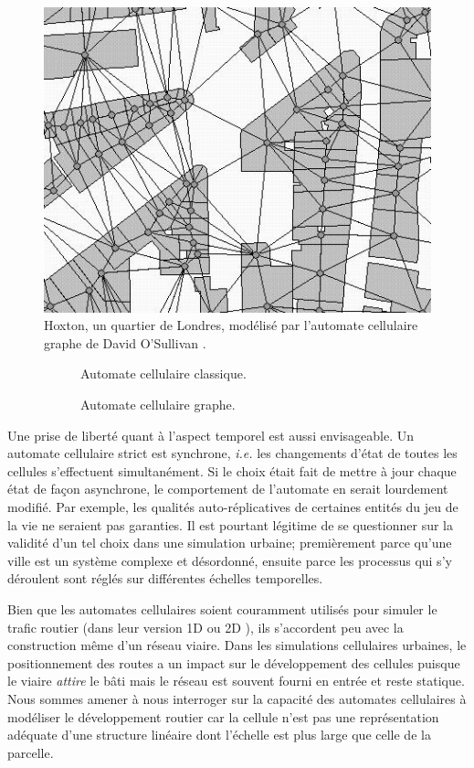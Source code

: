 \documentclass[12pt]{article}
\begin{document}
\begin{figure}[H]
  \centering
  \includegraphics[width=.7\linewidth]{images/gca.png}
  \caption{Hoxton, un quartier de Londres, modélisé par l'automate
    cellulaire graphe de David O'Sullivan \cite{O'Sullivan2000}.}
  \label{fig:sullivan}
\end{figure}

\begin{figure}
  \begin{subfigure}[b]{.5\linewidth}
    \centering
    
    \caption{Automate cellulaire classique.}
  \end{subfigure}
  \begin{subfigure}[b]{.5\linewidth}
    \centering
    
    \caption{Automate cellulaire graphe.}
  \end{subfigure}
  \caption{}
\end{figure}

Une prise de liberté quant à l'aspect temporel est aussi
envisageable. Un automate cellulaire strict est synchrone,
\textit{i.e.} les changements d'état de toutes les cellules
s'effectuent simultanément. Si le choix était fait de mettre à jour
chaque état de façon asynchrone, le comportement de l'automate en
serait lourdement modifié. Par exemple, les qualités auto-réplicatives
de certaines entités du jeu de la vie ne seraient pas garanties. Il
est pourtant légitime de se questionner sur la validité d'un tel choix
dans une simulation urbaine; premièrement parce qu'une ville est un
système complexe et désordonné, ensuite parce les processus qui s'y
déroulent sont réglés sur différentes échelles temporelles.

Bien que les automates cellulaires soient couramment utilisés pour
simuler le trafic routier (dans leur version 1D ou 2D
\cite{Queloz1996}), ils s'accordent peu avec la construction même d'un
réseau viaire. Dans les simulations cellulaires urbaines, le
positionnement des routes a un impact sur le développement des
cellules puisque le viaire \textit{attire} le bâti mais le réseau est
souvent fourni en entrée et reste statique. Nous sommes amener à nous
interroger sur la capacité des automates cellulaires à modéliser le
développement routier car la cellule n'est pas une représentation
adéquate d'une structure linéaire dont l'échelle est plus large que
celle de la parcelle.
\end{document}

